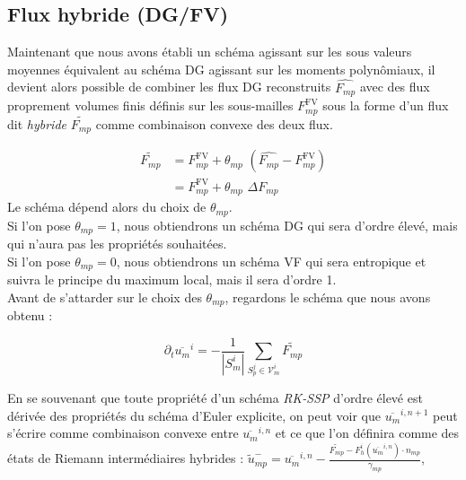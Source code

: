 \subsection{Flux hybride (DG/FV)}
\noindent
Maintenant que nous avons établi un schéma agissant sur les sous valeurs moyennes
équivalent au schéma DG agissant sur les moments polynômiaux, 
il devient alors possible de combiner les flux DG reconstruits $\widehat{F_{mp}}$ 
avec des flux proprement volumes finis définis sur les sous-mailles $F^{\text{FV}}_{mp}$ sous la forme d'un flux dit \textit{hybride} $\widetilde{F_{mp}}$ comme combinaison convexe des deux flux.

\begin{equation} 
\begin{aligned}
    \widetilde{F_{mp}}  &= F^{\text{FV}}_{mp} + \theta_{mp}\,\, (\widehat{F_{mp}} - F^{\text{FV}}_{mp})\\
                        &= F^{\text{FV}}_{mp} + \theta_{mp}\,\, \Delta F_{mp}
\end{aligned}
\end{equation}
Le schéma dépend alors du choix de $\theta_{mp}$. \\
Si l'on pose $\theta_{mp} = 1$, nous obtiendrons un schéma DG qui sera d'ordre élevé, mais qui n'aura pas les propriétés souhaitées. \\
Si l'on pose $\theta_{mp} = 0$, nous obtiendrons un schéma VF qui sera entropique et suivra le principe du maximum local, mais il sera d'ordre 1. \\
Avant de s'attarder sur le choix des $\theta_{mp}$, regardons le schéma que nous avons obtenu : 

\begin{equation}\label{DG_as_FV}
    \partial_t \overline{{u}_m}^i =  - \frac{1}{|S_m^i|} \sum_{S_p^j \in \mathcal{V}_m^i} \widetilde{F_{mp}}
\end{equation}

En se souvenant que toute propriété d'un schéma \textit{RK-SSP} d'ordre élevé est dérivée des propriétés du schéma d'Euler explicite, 
on peut voir que $\overline{{u}_m}^{i,n+1}$ peut s'écrire comme combinaison convexe entre $\overline{{u}_m}^{i,n}$ et ce que l'on définira comme des états de Riemann intermédiaires hybrides : 
$ \widetilde{{u}}_{mp}^- = \overline{{u}_m}^{i,n} - \frac{\widetilde{F_{mp}} -  F_h^i(\overline{{u}_m}^{i,n})\cdot n_{mp} }{\gamma_{mp}}$,

